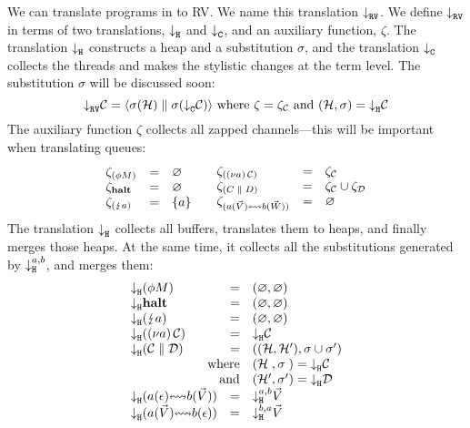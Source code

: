 \documentclass[sigplan,review,anonymous]{acmart}
\begin{document}
We can translate programs in \affineAGV to RV. We name this translation $\mtr{}$. We define $\mtr{}$ in terms of two translations, $\mtrh{}$ and $\mtrc{}$, and an auxiliary function, $\zeta$. The translation $\mtrh{}$ constructs a heap and a substitution $\sigma$, and the translation $\mtrc{}$ collects the threads and makes the stylistic changes at the term level. The substitution $\sigma$ will be discussed soon:
\[
  \mtr{\gvConf{C}} = \rvRedTup[\sigma(\mtrc{\gvConf{C}})]{\sigma(\rvHeap{H})}{}
  \text{ where }\zeta=\zeta_{\gvConf{C}}\text{ and }(\rvHeap{H},\sigma)=\mtrh{\gvConf{C}}
\]
The auxiliary function $\zeta$ collects all zapped channels---this will be important when translating queues:
\[
  \begin{array}{lcl}
    \zeta_{\parens{\gvThread{\phi}{M}}}
    & = & \varnothing
    \\
    \zeta_{\gvHalt}
    & = & \varnothing
    \\
    \zeta_{\parens{\gvZap{a}}}
    & = & \{a\}
  \end{array}
  \quad
  \begin{array}{lcl}
    \zeta_{\parens{\gvRes{a}{\gvConf{C}}}}
    & = & \zeta_{\gvConf{C}}
    \\
    \zeta_{\parens{\gvPar{C}{D}}}
    & = & \zeta_{\gvConf{C}} \cup \zeta_{\gvConf{D}}
    \\
    \zeta_{\parens{\gvBuf{a}{\gvVec{V}}{b}{\gvVec{W}}}}
    & = & \varnothing
  \end{array}
\]
The translation $\mtrh{}$ collects all buffers, translates them to heaps, and finally merges those heaps. At the same time, it collects all the substitutions generated by $\mtrh[a,b]{}$, and merges them:
\[
  \begin{array}{c}
    \begin{array}{lcl}
      \mtrh{\parens{\gvThread{\phi}{M}}}
      & = & (\varnothing, \varnothing) 
      \\
      \mtrh{\gvHalt}
      & = & (\varnothing, \varnothing)
      \\
      \mtrh{\parens{\gvZap{a}}}
      & = & (\varnothing, \varnothing)
      \\
      \mtrh{\parens{\gvRes{a}{\gvConf{C}}}}
      & = & \mtrh{\gvConf{C}}
      \\
      \mtrh{\parens{\gvPar{\gvConf{C}}{\gvConf{D}}}}
      & = & ((\rvHeap{H}\st{,}\,\rvHeap{H'}), \sigma \cup \sigma')
      \\
      \multicolumn{2}{r}{\text{where}}
      & (\rvHeap{H}\hphantom{'}, \sigma\hphantom{'}) = \mtrh{\gvConf{C}}
      \\
      \multicolumn{2}{r}{\text{and}}
      & (\rvHeap{H}', \sigma') = \mtrh{\gvConf{D}}
      \\
      \mtrh{\parens{\gvBuf{a}{\gvVecEmp}{b}{\gvVec{V}}}}
      & = & \mtrh[a,b]{\gvVec{V}}
      \\
      \mtrh{\parens{\gvBuf{a}{\gvVec{V}}{b}{\gvVecEmp}}}
      & = & \mtrh[b,a]{\gvVec{V}}
    \end{array}
  \end{array}
\]
\end{document}
